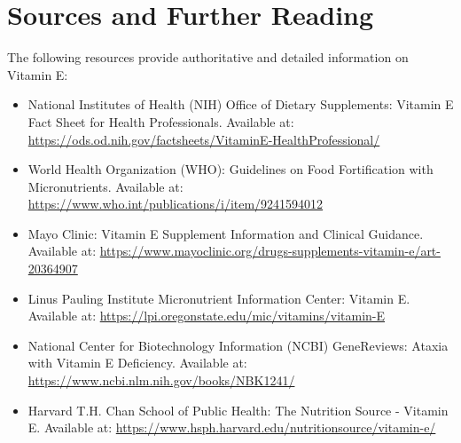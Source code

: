 \section*{Sources and Further Reading}
The following resources provide authoritative and detailed information on Vitamin E:

\begin{itemize}
    \item National Institutes of Health (NIH) Office of Dietary Supplements: Vitamin E Fact Sheet for Health Professionals. Available at: \url{https://ods.od.nih.gov/factsheets/VitaminE-HealthProfessional/}
    \item World Health Organization (WHO): Guidelines on Food Fortification with Micronutrients. Available at: \url{https://www.who.int/publications/i/item/9241594012}
    \item Mayo Clinic: Vitamin E Supplement Information and Clinical Guidance. Available at: \url{https://www.mayoclinic.org/drugs-supplements-vitamin-e/art-20364907}
    \item Linus Pauling Institute Micronutrient Information Center: Vitamin E. Available at: \url{https://lpi.oregonstate.edu/mic/vitamins/vitamin-E}
    \item National Center for Biotechnology Information (NCBI) GeneReviews: Ataxia with Vitamin E Deficiency. Available at: \url{https://www.ncbi.nlm.nih.gov/books/NBK1241/}
    \item Harvard T.H. Chan School of Public Health: The Nutrition Source - Vitamin E. Available at: \url{https://www.hsph.harvard.edu/nutritionsource/vitamin-e/}
\end{itemize}